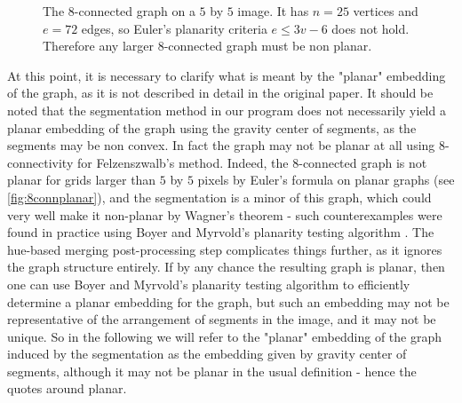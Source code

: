 \begin{figure}[htb!]
\centering
{}
\caption{The $8$-connected graph on a $5$ by $5$ image. It has $n = 25$ vertices and $e = 72$ edges, so Euler's planarity criteria $e \leq 3v - 6$ does not hold. Therefore any larger $8$-connected graph must be non planar.}
\label{fig:8connplanar}
\end{figure}

\begin{remark}
At this point, it is necessary to clarify what is meant by the "planar" embedding of the graph, as it is not described in detail in the original paper. It should be noted that the segmentation method in our program does not necessarily yield a planar embedding of the graph using the gravity center of segments, as the segments may be non convex. In fact the graph may not be planar at all using $8$-connectivity for Felzenszwalb's method. Indeed, the $8$-connected graph is not planar for grids larger than $5$ by $5$ pixels by Euler's formula on planar graphs (see \autoref{fig:8connplanar}), and the segmentation is a minor of this graph, which could very well make it non-planar by Wagner's theorem \cite{wagner1937eigenschaft} - such counterexamples were found in practice using Boyer and Myrvold's planarity testing algorithm \cite{boyer2004cutting}. The hue-based merging post-processing step complicates things further, as it ignores the graph structure entirely. If by any chance the resulting graph is planar, then one can use Boyer and Myrvold's planarity testing algorithm to efficiently determine a planar embedding for the graph, but such an embedding may not be representative of the arrangement of segments in the image, and it may not be unique. So in the following we will refer to the "planar" embedding of the graph induced by the segmentation as the embedding given by gravity center of segments, although it may not be planar in the usual definition - hence the quotes around planar.
\end{remark}

